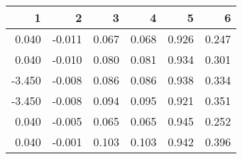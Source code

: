 \begin{table}[ht]
\centering
\begin{tabular}{rrrrrr}
  \hline
1 & 2 & 3 & 4 & 5 & 6 \\ 
  \hline
0.040 & -0.011 & 0.067 & 0.068 & 0.926 & 0.247 \\ 
  0.040 & -0.010 & 0.080 & 0.081 & 0.934 & 0.301 \\ 
  -3.450 & -0.008 & 0.086 & 0.086 & 0.938 & 0.334 \\ 
  -3.450 & -0.008 & 0.094 & 0.095 & 0.921 & 0.351 \\ 
  0.040 & -0.005 & 0.065 & 0.065 & 0.945 & 0.252 \\ 
  0.040 & -0.001 & 0.103 & 0.103 & 0.942 & 0.396 \\ 
   \hline
\end{tabular}
\end{table}
